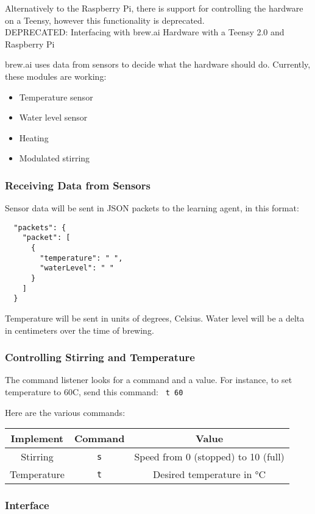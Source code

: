 Alternatively to the Raspberry Pi, there is support for controlling the hardware on a Teensy, however this functionality is deprecated. \\

DEPRECATED: Interfacing with brew.ai Hardware with a Teensy 2.0 and Raspberry Pi

brew.ai uses data from sensors to decide what the hardware should do. Currently, these
modules are working:

\begin{itemize}
\item Temperature sensor
\item Water level sensor
\item Heating
\item Modulated stirring
\end{itemize}

\subsubsection*{Receiving Data from Sensors}
Sensor data will be sent in JSON packets to the learning agent, in this format:
\begin{lstlisting}
  "packets": {
    "packet": [
      {
        "temperature": " ",
        "waterLevel": " "
      }
    ]
  }
\end{lstlisting}

Temperature will be sent in units of degrees, Celsius. Water level will be a delta in centimeters
over the time of brewing.\\

\subsubsection*{Controlling Stirring and Temperature}
The command listener looks for a command and a value.
For instance, to set temperature to 60C, send this command:
\verb| t 60 |

Here are the various commands:
\begin{center}
\begin{tabular}{ c c c }
 Implement & Command & Value \\ 
 \hline
 Stirring & \verb|s| & Speed from 0 (stopped) to 10 (full) \\
 Temperature & \verb|t| & Desired temperature in °C 
\end{tabular}
\end{center}

\subsubsection{Interface}

